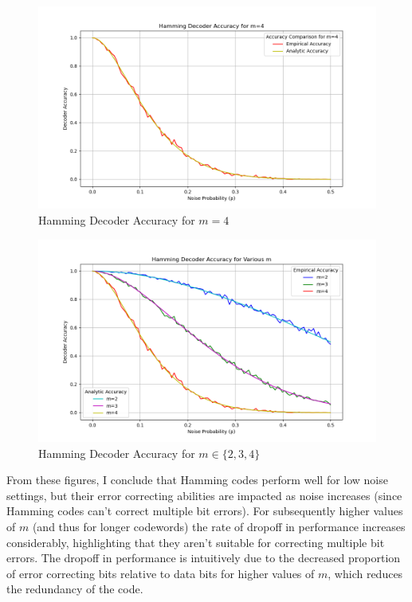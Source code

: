 \documentclass[fleqn]{article}
\begin{document}
  \begin{figure}[ht!]
      \centering
      \includegraphics[width=1.0\textwidth]{../images/accuracy_m4.png}
      \caption{Hamming Decoder Accuracy for $m=4$}
      \label{fig:accuracy_m4}
  \end{figure}

  \begin{figure}[ht!]
      \centering
      \includegraphics[width=1.0\textwidth]{../images/accuracy_overlay.png}
      \caption{Hamming Decoder Accuracy for $m \in \{ 2, 3, 4 \}$}
      \label{fig:accuracy_overlay}
  \end{figure}

  From these figures, I conclude that Hamming codes perform well for low noise settings, but their error correcting abilities are impacted as noise increases (since Hamming codes can't correct multiple bit errors).
  For subsequently higher values of $m$ (and thus for longer codewords) the rate of dropoff in performance increases considerably, highlighting that they aren't suitable for correcting multiple bit errors.
  The dropoff in performance is intuitively due to the decreased proportion of error correcting bits relative to data bits for higher values of $m$, which reduces the redundancy of the code.
\end{document}
